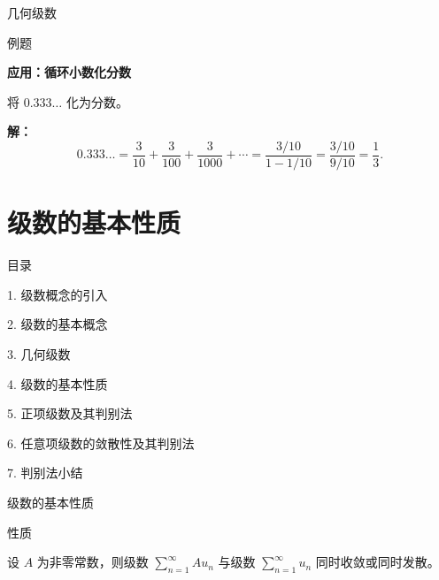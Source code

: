 \documentclass[aspectratio=169,10pt,fontset=fandol]{ctexbeamer}
\begin{document}
\begin{frame}[t,fragile]{几何级数}
\footnotesize
\begin{block}{例题}
{\footnotesize
\textbf{应用：循环小数化分数}\par

将 \(0.333\ldots\) 化为分数。

}
\end{block}
\pause
{\footnotesize
\textbf{解：}
\[
0.333\ldots = \dfrac{3}{10} + \dfrac{3}{100} + \dfrac{3}{1000} + \cdots = \dfrac{3/10}{1-1/10} = \dfrac{3/10}{9/10} = \dfrac{1}{3}.
\]

}
\end{frame}
\section{级数的基本性质}
\begin{frame}[t,fragile]{目录}
\normalsize
{\color{black}\normalsize 1. 级数概念的引入\par}\vspace{0.3em}
{\color{black}\normalsize 2. 级数的基本概念\par}\vspace{0.3em}
{\color{black}\normalsize 3. 几何级数\par}\vspace{0.3em}
{\color{blue}\normalsize 4. 级数的基本性质\par}\vspace{0.3em}
{\color{gray!40}\normalsize 5. 正项级数及其判别法\par}\vspace{0.3em}
{\color{gray!40}\normalsize 6. 任意项级数的敛散性及其判别法\par}\vspace{0.3em}
{\color{gray!40}\normalsize 7. 判别法小结\par}\vspace{0.3em}
\end{frame}
\begin{frame}[t,fragile]{级数的基本性质}
\footnotesize
\begin{block}{性质}
{\footnotesize
设 $A$ 为非零常数，则级数 $\sum\limits_{n = 1}^{  \infty } A u_n$ 与级数 $\sum\limits_{n = 1}^{  \infty } u_n$ 同时收敛或同时发散。

}
\end{block}
\end{frame}
\end{document}
